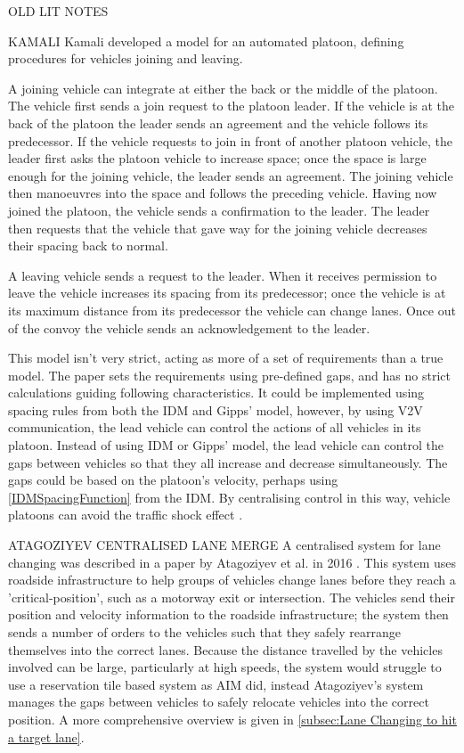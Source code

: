 OLD LIT NOTES

KAMALI
Kamali developed a model for an automated platoon, defining procedures for vehicles joining and leaving. 

A joining vehicle can integrate at either the back or the middle of the platoon. The vehicle first sends a join request to the platoon leader. If the vehicle is at the back of the platoon the leader sends an agreement and the vehicle follows its predecessor. If the vehicle requests to join in front of another platoon vehicle, the leader first asks the platoon vehicle to increase space; once the space is large enough for the joining vehicle, the leader sends an agreement. The joining vehicle then manoeuvres into the space and follows the preceding vehicle. Having now joined the platoon, the vehicle sends a confirmation to the leader. The leader then requests that the vehicle that gave way for the joining vehicle decreases their spacing back to normal.

A leaving vehicle sends a request to the leader. When it receives permission to leave the vehicle increases its spacing from its predecessor; once the vehicle is at its maximum distance from its predecessor the vehicle can change lanes. Once out of the convoy the vehicle sends an acknowledgement to the leader.

This model isn't very strict, acting as more of a set of requirements than a true model. The paper sets the requirements using pre-defined gaps, and has no strict calculations guiding following characteristics. It could be implemented using spacing rules from both the IDM and Gipps' model, however, by using V2V communication, the lead vehicle can control the actions of all vehicles in its platoon. Instead of using IDM or Gipps' model, the lead vehicle can control the gaps between vehicles so that they all increase and decrease simultaneously. The gaps could be based on the platoon's velocity, perhaps using \eqref{IDMSpacingFunction} from the IDM. By centralising control in this way, vehicle platoons can avoid the traffic shock effect \citep{Daganzo1994}.

ATAGOZIYEV CENTRALISED LANE MERGE
A centralised system for lane changing was described in a paper by Atagoziyev et al. in 2016 \citep{Atagoziyev2016}. This system uses roadside infrastructure to help groups of vehicles change lanes before they reach a 'critical-position', such as a motorway exit or intersection. The vehicles send their position and velocity information to the roadside infrastructure; the system then sends a number of orders to the vehicles such that they safely rearrange themselves into the correct lanes.  Because the distance travelled by the vehicles involved can be large, particularly at high speeds, the system would struggle to use a reservation tile based system as AIM did, instead Atagoziyev's system manages the gaps between vehicles to safely relocate vehicles into the correct position. A more comprehensive overview is given in \ref{subsec:Lane Changing to hit a target lane}.

